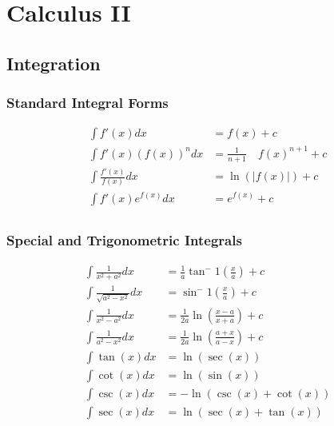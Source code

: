 \documentclass[../main]{subfiles}
\begin{document}
\section{Calculus II}

\subsection{Integration}

	\subsubsection{Standard Integral Forms}

	\begin{equation*} \begin{aligned}
	\int f'(x) dx &= f(x) + c \\
	\int f'(x) (f(x))^n dx &= \frac{1}{n+1} \quad f(x)^{n+1} + c\\
	\int \frac{f'(x)}{f(x)} dx &= \ln(|f(x)|) + c \\
	\int f'(x) e^{f(x)} dx &= e^{f(x)} + c \\
	\end{aligned} \end{equation*}

	\subsubsection{Special and Trigonometric Integrals}

	\begin{equation*} \begin{aligned}
	\int \frac{1}{x^2+a^2} dx &= \frac{1}{a} \tan^-1 \left( \frac{x}{a} \right) + c \\
	\int \frac{1}{\sqrt{a^2-x^2}} dx &= \sin^-1 \left( \frac{x}{a} \right) + c \\
	\int \frac{1}{x^2-a^2} dx &= \frac{1}{2a} \ln \left( \frac{x-a}{x+a} \right) + c \\
	\int \frac{1}{a^2-x^2} dx &= \frac{1}{2a} \ln \left( \frac{a+x}{a-x} \right) + c \\
	\int \tan(x) dx &= \ln(\sec(x)) \\
	\int \cot(x) dx &= \ln(\sin(x)) \\
	\int \csc(x) dx &= -\ln(\csc(x) + \cot(x)) \\
	\int \sec(x) dx &= \ln(\sec(x) + \tan(x)) \\
	\end{aligned} \end{equation*}
\end{document}
